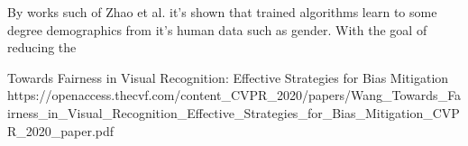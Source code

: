 \documentclass[
    11pt,
    a4paper,
    brazil
    ]{article}
\begin{document}
By works such of Zhao et al. \cite{bolukbasi2016man} it's shown that trained algorithms learn to some degree demographics from it's human data such as gender. With the goal of reducing the 

Towards Fairness in Visual Recognition: Effective Strategies for Bias Mitigation
https://openaccess.thecvf.com/content_CVPR_2020/papers/Wang_Towards_Fairness_in_Visual_Recognition_Effective_Strategies_for_Bias_Mitigation_CVPR_2020_paper.pdf


% 
% 
% 
% 
% 
% 
% 




\renewcommand{\refname}{References}

\end{document}
